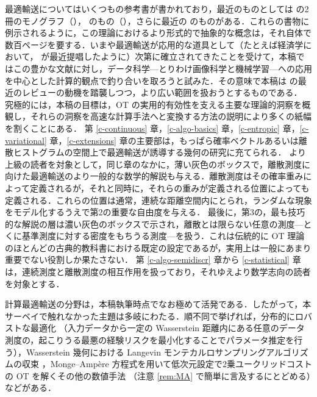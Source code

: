 最適輸送についてはいくつもの参考書が書かれており，最近のものとしては \citeauthor{Villani03} の2冊のモノグラフ（\citeyear{Villani03,Villani09}），\citeauthor{rachev1998mass} のもの（\citeyear{rachev1998mass,rachev1998mass2}），さらに最近の \citet{SantambrogioBook} のものがある．これらの書物に例示されるように，この理論におけるより形式的で抽象的な概念は，それ自体で数百ページを要する．いまや最適輸送が応用的な道具として（たとえば経済学において，\citet{galichon2016optimal} が最近提唱したように）次第に確立されてきたことを受けて，本稿ではこの豊かな文献に対し，データ科学---とりわけ画像科学と機械学習---への応用を中心とした計算的観点で釣り合いを取ろうと試みた．その意味で本稿は \citet{kolouri2017optimal} の最近のレビューの動機を踏襲しつつ，より広い範囲を扱おうとするものである．
%
究極的には，本稿の目標は，OT の実用的有効性を支える主要な理論的洞察を概観し，それらの洞察を高速な計算手法へと変換する方法の説明により多くの紙幅を割くことにある．
%
第 \ref{c-continuous} 章，\ref{c-algo-basics} 章，\ref{c-entropic} 章，\ref{c-variational} 章，\ref{c-extensions} 章の主要部は，もっぱら確率ベクトルあるいは離散ヒストグラムの空間上で最適輸送が誘導する幾何の研究に充てられる．
%
より上級の読者を対象として，同じ章のなかに，薄い灰色のボックスで，離散測度に向けた最適輸送のより一般的な数学的解説も与える．離散測度はその確率重みによって定義されるが，それと同時に，それらの重みが定義される位置によっても定義される．これらの位置は通常，連続な距離空間内にとられ，ランダムな現象をモデル化するうえで第2の重要な自由度を与える．
%
最後に，第3の，最も技巧的な解説の層は濃い灰色のボックスで示され，離散とは限らない任意の測度---とくに基準測度に対する密度をもちうる測度---を扱う．これは伝統的に OT 理論のほとんどの古典的教科書における既定の設定であるが，実用上は一般にあまり重要でない役割しか果たさない．
%
第 \ref{c-algo-semidiscr} 章から \ref{c-statistical} 章は，連続測度と離散測度の相互作用を扱っており，それゆえより数学志向の読者を対象とする．

計算最適輸送の分野は，本稿執筆時点でなお極めて活発である．したがって，本サーベイで触れなかった主題は多岐にわたる．順不同で挙げれば，分布的にロバストな最適化 \citep{NIPS2015_5745,esfahani2018data,NIPS2018_7534,NIPS2018_8015}（入力データから一定の Wasserstein 距離内にある任意のデータ測度の，起こりうる最悪の経験リスクを最小化することでパラメータ推定を行う），Wasserstein 幾何における Langevin モンテカルロサンプリングアルゴリズムの収束 \citep{dalalyan2017user,pmlr-v65-dalalyan17a,pmlr-v75-bernton18a}，Monge--Amp\`ere 方程式を用いて低次元設定で2乗ユークリッドコストの OT を解くその他の数値手法 \citep{froese2011convergent,benamou2014numerical,sulman2011efficient}（注意 \ref{rem:MA} で簡単に言及するにとどめる）などがある．



